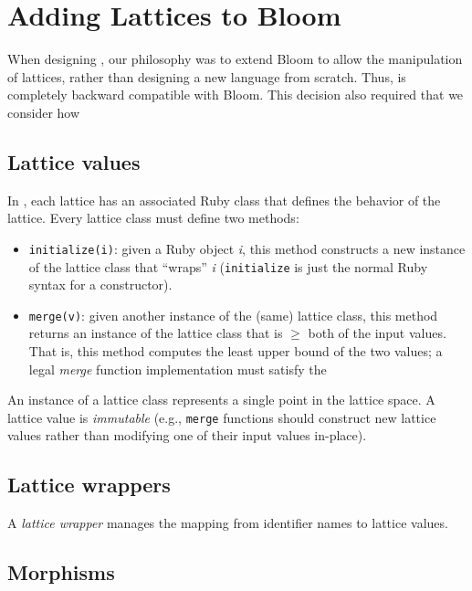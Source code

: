 \section{Adding Lattices to Bloom}
\label{sec:impl}


When designing \lang, our philosophy was to extend Bloom to allow the
manipulation of lattices, rather than designing a new language from
scratch. Thus, \lang is completely backward compatible with Bloom. This decision
also required that we consider how 

\subsection{Lattice values}
In \lang, each lattice has an associated Ruby class that defines the behavior of
the lattice. Every lattice class must define two methods:
\begin{itemize}
\item \texttt{initialize(i)}: given a Ruby object \emph{i}, this method
  constructs a new instance of the lattice class that ``wraps'' \emph{i}
  (\texttt{initialize} is just the normal Ruby syntax for a constructor).
\item \texttt{merge(v)}: given another instance of the (same) lattice class,
  this method returns an instance of the lattice class that is $\ge$ both of the
  input values. That is, this method computes the least upper bound of the two
  values; a legal \emph{merge} function implementation must satisfy the 
\end{itemize}
An instance of a lattice class represents a single point in the lattice space. A
lattice value is \emph{immutable} (e.g., \texttt{merge} functions should
construct new lattice values rather than modifying one of their input values
in-place). 

\subsection{Lattice wrappers}
A \emph{lattice wrapper} manages the mapping from identifier names to lattice
values.

\subsection{Morphisms}

